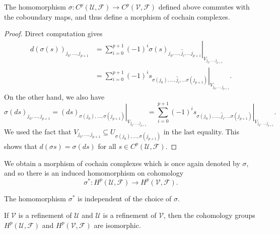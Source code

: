 \begin{proposition}
	The homomorphism $\sigma \colon C^p(\mathcal{U}, \mathcal{F}) \to C^p(\mathcal{V}, \mathcal{F})$ defined above commutes with the coboundary maps, and thus define a morphism of cochain complexes.
\end{proposition}
\begin{proof}
	Direct computation gives
	\begin{align*}
		d(\sigma(s))_{j_0, \dotsc, j_{p + 1}} & = \sum_{i = 0}^{p + 1 } (-1)^{i}\left.\sigma(s)_{j_0, \dotsc, \hat{j}_i, \dotsc j_{p + 1}}\right|_{V_{j_0, \dotsc, j_{p + 1}}} \\
		& = \sum_{i = 0}^{p + 1 } (-1)^{i}\left. s_{\sigma(j_0), \dotsc, \hat{j}_i, \dotsc \sigma(j_{p + 1})}\right|_{V_{j_0, \dotsc, j_{p + 1}}}.
	\end{align*}
	On the other hand, we also have
	\begin{equation*}
		\sigma(ds)_{j_0, \dotsc, j_{p + 1}} = \left. (ds)_{\sigma(j_0), \dotsc, \sigma(j_{p + 1})} \right|_{V_{j_0, \dotsc, j_{p + 1}}}= \sum_{i = 0}^{p + 1 } (-1)^{i}\left. s_{\sigma(j_0), \dotsc, \hat{j}_i, \dotsc \sigma(j_{p + 1})} \right|_{V_{j_0, \dotsc, j_{p + 1}}}.
	\end{equation*}
	We used the fact that $V_{j_0, \dotsc, j_{p + 1}} \subseteq U_{\sigma(j_0), \dotsc, \sigma(j_{p + 1})}$ in the last equality. This shows that $d(\sigma s) = \sigma(ds)$ for all $s \in C^p(\mathcal{U}, \mathcal{F})$.
\end{proof}

We obtain a morphism of cochain complexes which is once again denoted by $\sigma$, and so there is an induced homomorphism on cohomology
\begin{equation*}
	\sigma^\ast \colon H^p(\mathcal{U}, \mathcal{F}) \to H^p(\mathcal{V}, \mathcal{F}).
\end{equation*}

\begin{lemma}\label{chap15:maps-on-cohomology-intependent-of-refinement}
	The homomorphism $\sigma^\ast$ is independent of the choice of $\sigma$.
\end{lemma}

\begin{corollary}
	If $\mathcal{V}$ is a refinement of $\mathcal{U}$ and $\mathcal{U}$ is a refinement of $\mathcal{V}$, then the cohomology groups $H^p(\mathcal{U}, \mathcal{F})$ and $H^p(\mathcal{V}, \mathcal{F})$ are isomorphic.
\end{corollary}


